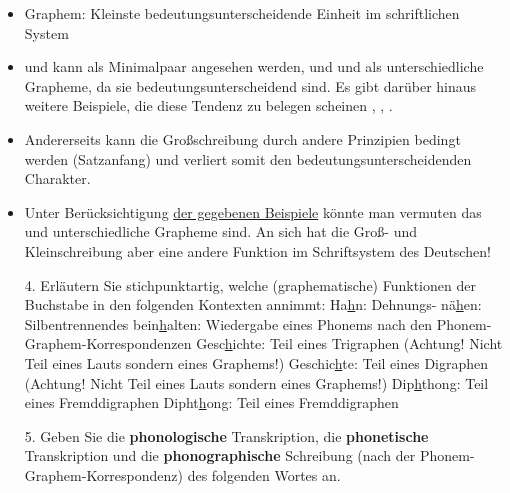 {\begin{frame}[allowframebreaks]
\begin{itemize}
				\item Graphem: Kleinste bedeutungsunterscheidende Einheit im schriftlichen System
				\item {} und  kann als Minimalpaar angesehen werden, und  und  als unterschiedliche Grapheme, da sie bedeutungsunterscheidend sind. Es gibt darüber hinaus weitere Beispiele, die diese Tendenz zu belegen scheinen  \vs {},  \vs {},  \vs {}.
				\item Andererseits kann die Großschreibung durch andere Prinzipien bedingt werden (\zB Satzanfang) und verliert somit den bedeutungsunterscheidenden Charakter.
				\item Unter Berücksichtigung \underline{der gegebenen Beispiele} könnte man vermuten das  und  unterschiedliche Grapheme sind. An sich hat die Groß- und Kleinschreibung aber eine andere Funktion im Schriftsystem des Deutschen!
		\end{itemize}
	\end{frame}
	
	\begin{frame}
		\begin{itemize}
			\item[4.] Erläutern Sie stichpunktartig, welche (graphematische) Funktionen der Buchstabe  in den folgenden Kontexten annimmt:
			\eal
			\ex Ha\underline{h}n: Dehnungs-
			\bigskip
			\ex nä\underline{h}en: Silbentrennendes 
			\bigskip
			\ex bein\underline{h}alten: Wiedergabe eines Phonems \textipa{[h]} nach den Phonem-Graphem-Korrespondenzen
			\bigskip
			\ex Gesc\underline{h}ichte: Teil eines Trigraphen  (Achtung! Nicht Teil eines Lauts sondern eines Graphems!)
			\bigskip
			\ex Geschic\underline{h}te: Teil eines Digraphen  (Achtung! Nicht Teil eines Lauts sondern eines Graphems!)
			\bigskip
			\ex Dip\underline{h}thong: Teil eines Fremddigraphen 
			\bigskip
			\ex Dipht\underline{h}ong: Teil eines Fremddigraphen 
			\zl
		\end{itemize}
	\end{frame}
	
	\begin{frame}
		\begin{itemize}
			\item[5.] Geben Sie die \textbf{phonologische} Transkription, die \textbf{phonetische} Transkription und die \textbf{phonographische} Schreibung (nach der Phonem-Graphem-Korrespondenz) des folgenden Wortes an.
			

\end{itemize}
\end{frame}}
